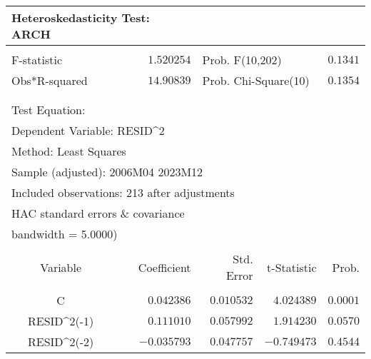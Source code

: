 \begin{tabular}{lrrrr}
\multicolumn{2}{l}{Heteroskedasticity Test: ARCH}&\multicolumn{1}{c}{}&\multicolumn{1}{c}{}&\multicolumn{1}{c}{}\\
[4.5pt] \hline \\ [-4.5pt]
\multicolumn{1}{l}{F-statistic}&\multicolumn{1}{r}{$1.520254$}&\multicolumn{2}{l}{Prob. F(10,202)}&\multicolumn{1}{r}{$0.1341$}\\
\multicolumn{1}{l}{Obs*R-squared}&\multicolumn{1}{r}{$14.90839$}&\multicolumn{2}{l}{Prob. Chi-Square(10)}&\multicolumn{1}{r}{$0.1354$}\\
[4.5pt] \hline \\ [-4.5pt]
\multicolumn{1}{c}{}&\multicolumn{1}{c}{}&\multicolumn{1}{c}{}&\multicolumn{1}{c}{}&\multicolumn{1}{c}{}\\
\multicolumn{1}{l}{Test Equation:}&\multicolumn{1}{c}{}&\multicolumn{1}{c}{}&\multicolumn{1}{c}{}&\multicolumn{1}{c}{}\\
\multicolumn{2}{l}{Dependent Variable: RESID\textasciicircum 2}&\multicolumn{1}{c}{}&\multicolumn{1}{c}{}&\multicolumn{1}{c}{}\\
\multicolumn{2}{l}{Method: Least Squares}&\multicolumn{1}{c}{}&\multicolumn{1}{c}{}&\multicolumn{1}{c}{}\\
\multicolumn{3}{l}{Sample (adjusted): 2006M04 2023M12}&\multicolumn{1}{c}{}&\multicolumn{1}{c}{}\\
\multicolumn{4}{l}{Included observations: 213 after adjustments}&\multicolumn{1}{c}{}\\
\multicolumn{6}{l}{HAC standard errors \& covariance}\\
\multicolumn{2}{l}{bandwidth = 5.0000)}&\multicolumn{1}{c}{}&\multicolumn{1}{c}{}&\multicolumn{1}{c}{}\\
[4.5pt] \hline \\ [-4.5pt]
\multicolumn{1}{c}{Variable}&\multicolumn{1}{r}{Coefficient}&\multicolumn{1}{r}{Std. Error}&\multicolumn{1}{r}{t-Statistic}&\multicolumn{1}{r}{Prob.}\\
[4.5pt] \hline \\ [-4.5pt]
\multicolumn{1}{c}{C}&\multicolumn{1}{r}{$0.042386$}&\multicolumn{1}{r}{$0.010532$}&\multicolumn{1}{r}{$4.024389$}&\multicolumn{1}{r}{$0.0001$}\\
\multicolumn{1}{c}{RESID\textasciicircum 2(-1)}&\multicolumn{1}{r}{$0.111010$}&\multicolumn{1}{r}{$0.057992$}&\multicolumn{1}{r}{$1.914230$}&\multicolumn{1}{r}{$0.0570$}\\
\multicolumn{1}{c}{RESID\textasciicircum 2(-2)}&\multicolumn{1}{r}{$-0.035793$}&\multicolumn{1}{r}{$0.047757$}&\multicolumn{1}{r}{$-0.749473$}&\multicolumn{1}{r}{$0.4544$}\\

\end{tabular}
